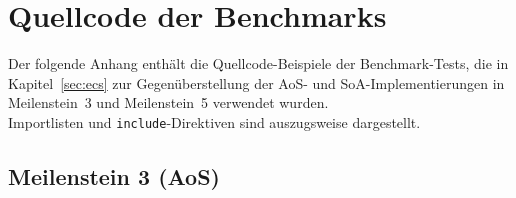 \chapter{Quellcode der Benchmarks}\label{ch:benchmarkcode}

Der folgende Anhang enthält die Quellcode-Beispiele der Benchmark-Tests, die in Kapitel~\ref{sec:ecs} zur Gegenüberstellung der AoS- und SoA-Implementierungen in Meilenstein~3 und Meilenstein~5 verwendet wurden.\\

\noindent
Importlisten und \texttt{include}-Direktiven sind auszugsweise dargestellt.

\section{Meilenstein 3 (AoS)}\label{sec:benchmarkcode_aos}

